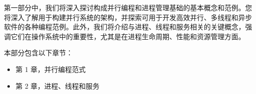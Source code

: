 第一部分中，我们将深入探讨构成并行编程和进程管理基础的基本概念和范例。您将深入了解用于构建并行系统的架构，并探索可用于开发高效并行、多线程和异步软件的各种编程范例。此外，我们将介绍与进程、线程和服务相关的关键概念，强调它们在操作系统中的重要性，尤其是在进程生命周期、性能和资源管理方面。

本部分包含以下章节：

\begin{itemize}
\item
第 1 章，并行编程范式

\item
第 2 章，进程、线程和服务
\end{itemize}

